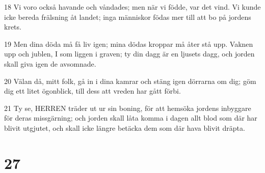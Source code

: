 \par 18 Vi voro också havande och våndades; men när vi födde, var det vind. Vi kunde icke bereda frälsning åt landet; inga människor födas mer till att bo på jordens krets.
\par 19 Men dina döda må få liv igen; mina dödas kroppar må åter stå upp. Vaknen upp och jublen, I som liggen i graven; ty din dagg är en ljusets dagg, och jorden skall giva igen de avsomnade.
\par 20 Välan då, mitt folk, gå in i dina kamrar och stäng igen dörrarna om dig; göm dig ett litet ögonblick, till dess att vreden har gått förbi.
\par 21 Ty se, HERREN träder ut ur sin boning, för att hemsöka jordens inbyggare för deras missgärning; och jorden skall låta komma i dagen allt blod som där har blivit utgjutet, och skall icke längre betäcka dem som där hava blivit dräpta.

\chapter{27}

